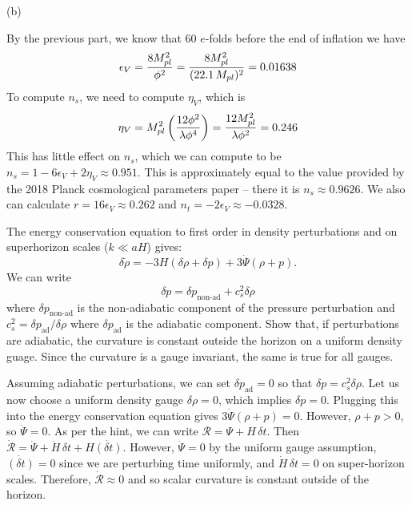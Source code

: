 \documentclass{lkx_pset}
\begin{document}
\begin{parts}
\begin{part}{(b)}
  \end{part}
  By the previous part, we know that $60$ $e$-folds before the end of inflation we have \[\epsilon_V = \frac{8M_{pl}^2}{\phi^2} = \frac{8M_{pl}^2}{(22.1\,M_{pl})^2} = 0.01638\]
  To compute $n_s$, we need to compute $\eta_V$, which is
  \[
    \eta_V = M_{pl}^2\left(\frac{12\phi^2}{\lambda \phi^4}\right) = \frac{12M_{pl}^2}{\lambda \phi^2} = 0.246
  \]
  This has little effect on $n_s$, which we can compute to be $n_s = 1-6\epsilon_V+2\eta_V\approx 0.951$. This is approximately equal to the value provided by the 2018 Planck cosmological parameters paper -- there it is $n_s\approx 0.9626$. We also can calculate $r=16\epsilon_V\approx 0.262$ and $n_t=-2\epsilon_V \approx -0.0328$.
\end{parts}

\pagebreak
\begin{problem}{4}
  The energy conservation equation to first order in density perturbations and on superhorizon scales ($k\ll aH$) gives:
  \[
    \delta \dot{\rho} = -3H(\delta\rho + \delta p) + 3\dot{\Psi}(\rho+p).
  \]
  We can write
  \[
  \delta p = \delta p_{\textrm{non-ad}} + c_s^2\delta\rho
  \]
  where $\delta p_{\textrm{non-ad}}$ is the non-adiabatic component of the pressure perturbation and $c_s^2=\delta p_{\textrm{ad}}/\delta\rho$ where $\delta p_{\textrm{ad}}$ is the adiabatic component. Show that, if perturbations are adiabatic, the curvature is constant outside the horizon on a uniform density guage. Since the curvature is a gauge invariant, the same is true for all gauges.
\end{problem}
\begin{solution}
  Assuming adiabatic perturbations, we can set $\delta p_{\textrm{ad}}=0$ so that $\delta p = c_s^2\delta \rho$. Let us now choose a uniform density gauge $\delta \rho=0$, which implies $\delta p=0$. Plugging this into the energy conservation equation gives $3\dot{\Psi}(\rho + p)=0$. However, $\rho+p>0$, so $\dot{\Psi}=0$. As per the hint, we can write $\mathcal{R} = \Psi + H\,\delta t$. Then $\dot{\mathcal{R}}=\dot{\Psi} + \dot{H}\,\delta t + H\dot{(\delta t)}$. However, $\dot{\Psi}=0$ by the uniform gauge assumption, $\dot{(\delta t)}=0$ since we are perturbing time uniformly, and $\dot{H}\,\delta t=0$ on super-horizon scales. Therefore, $\dot{\mathcal{R}}\approx 0$ and so scalar curvature is constant outside of the horizon.
\end{solution}
\end{document}
